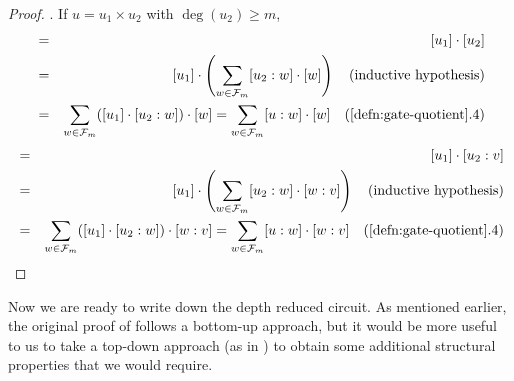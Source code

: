 \begin{proof}
. 
If $u = u_1 \times u_2$ with $\deg(u_2) \geq m$, 
\begin{eqnarray*}
[u] &=& [u_1] \cdot [u_2]\\
    &=& [u_1] \cdot \inparen{\sum_{w\in \mathcal{F}_m} [u_2:w]\cdot [w]} \quad\text{(inductive hypothesis)}\\
    &=& \sum_{w\in \mathcal{F}_m}([u_1]\cdot [u_2:w]) \cdot [w] = \sum_{w\in \mathcal{F}_m}[u:w] \cdot [w]\quad\text{(\autoref{defn:gate-quotient}.4)}
\end{eqnarray*}
\begin{eqnarray*}
[u:v] &=& [u_1] \cdot [u_2:v]\\
    &=& [u_1] \cdot \inparen{\sum_{w\in \mathcal{F}_m} [u_2:w]\cdot [w:v]} \quad\text{(inductive hypothesis)}\\
    &=& \sum_{w\in \mathcal{F}_m}([u_1]\cdot [u_2:w]) \cdot [w:v] = \sum_{w\in \mathcal{F}_m}[u:w] \cdot [w:v]\quad\text{(\autoref{defn:gate-quotient}.4)}
\end{eqnarray*}

\end{proof}

Now we are ready to write down the depth reduced circuit. 
As mentioned
earlier, the original proof of \cite{vsbr83} follows a bottom-up
approach, but it would be more useful to us to take a top-down
approach (as in \cite{ajmv98}) to obtain some additional structural
properties that we would require.\\


